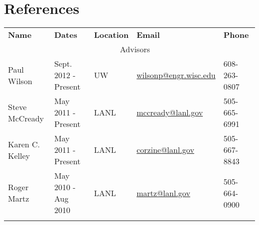 %
%
%

\section{References}
\begin{longtable}{lllll} \vspace{4mm}
   \textbf{Name}    & \textbf{Dates}    & \textbf{Location}	 	& \textbf{Email} & \textbf{Phone} \\  \vspace{2mm}

              & \multicolumn{3}{c}{\Large{Advisors}} &  \\  \vspace{2mm}
{Paul Wilson}\label{paul_wilson} & {Sept. 2012 - Present}  & {UW}& \href{mailto:wilsonp@engr.wisc.edu}{wilsonp@engr.wisc.edu} &  608-263-0807 \\ \vspace{2mm}

{Steve McCready} \label{steve_mccready}& {May 2011 - Present} &{LANL} & \href{mailto:mccready@lanl.gov}{mccready@lanl.gov} & 505-665-6991\\ \vspace{2mm}

{Karen C. Kelley} \label{karen_kelley} &   {May 2011 - Present} &{LANL} & \href{mailto:corzine@lanl.gov}{corzine@lanl.gov} & 505-667-8843\\ \vspace{2mm}


{Roger Martz}\label{roger_martz} & {May 2010 - Aug 2010} & {LANL}  & \href{mailto:martz@lanl.gov}{martz@lanl.gov} &  505-664-0900\\ \vspace{2mm}

				       

  

\end{longtable}
